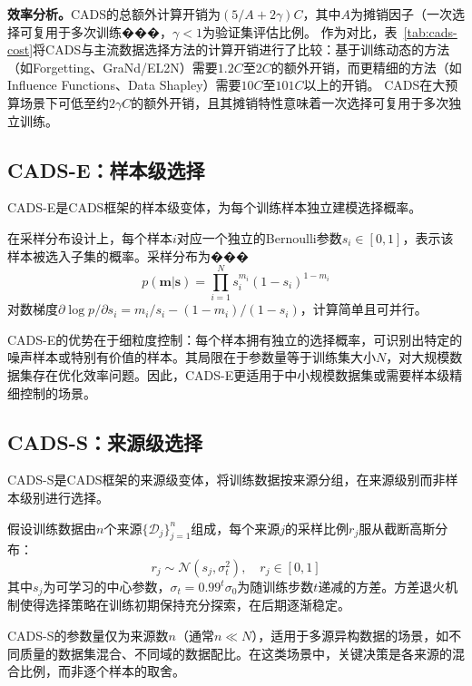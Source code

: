 \textbf{效率分析。}CADS的总额外计算开销为$(5/A + 2\gamma)C$，其中$A$为摊销因子（一次选择可复用于多次训练���，$\gamma < 1$为验证集评估比例。%
作为对比，表~\ref{tab:cads-cost}将CADS与主流数据选择方法的计算开销进行了比较：基于训练动态的方法（如Forgetting\cite{toneva2018empirical}、GraNd/EL2N\cite{paul2021deep}）需要$1.2C$至$2C$的额外开销，而更精细的方法（如Influence Functions、Data Shapley）需要$10C$至$101C$以上的开销。%
CADS在大预算场景下可低至约$2\gamma C$的额外开销，且其摊销特性意味着一次选择可复用于多次独立训练。

\subsection{CADS-E：样本级选择}

CADS-E是CADS框架的样本级变体，为每个训练样本独立建模选择概率。

在采样分布设计上，每个样本$i$对应一个独立的Bernoulli参数$s_i \in [0,1]$，表示该样本被选入子集的概率。采样分布为���
\begin{equation}\label{eq:cads-e}
  p(\mathbf{m}|\mathbf{s}) = \prod_{i=1}^{N} s_i^{m_i}(1-s_i)^{1-m_i}
\end{equation}
对数梯度$\partial \log p / \partial s_i = m_i/s_i - (1-m_i)/(1-s_i)$，计算简单且可并行。

CADS-E的优势在于细粒度控制：每个样本拥有独立的选择概率，可识别出特定的噪声样本或特别有价值的样本。其局限在于参数量等于训练集大小$N$，对大规模数据集存在优化效率问题。因此，CADS-E更适用于中小规模数据集或需要样本级精细控制的场景。

\subsection{CADS-S：来源级选择}

CADS-S是CADS框架的来源级变体，将训练数据按来源分组，在来源级别而非样本级别进行选择。

假设训练数据由$n$个来源$\{\mathcal{D}_j\}_{j=1}^{n}$组成，每个来源$j$的采样比例$r_j$服从截断高斯分布：
\begin{equation}\label{eq:cads-s}
  r_j \sim \mathcal{N}(s_j, \sigma_t^2), \quad r_j \in [0,1]
\end{equation}
其中$s_j$为可学习的中心参数，$\sigma_t = 0.99^t \sigma_0$为随训练步数$t$递减的方差。方差退火机制使得选择策略在训练初期保持充分探索，在后期逐渐稳定。

CADS-S的参数量仅为来源数$n$（通常$n \ll N$），适用于多源异构数据的场景，如不同质量的数据集混合、不同域的数据配比。在这类场景中，关键决策是各来源的混合比例，而非逐个样本的取舍。

